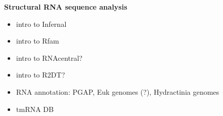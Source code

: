 \documentclass[landscape]{slides}
\begin{document}
\begin{slide}
\begin{center}
  \textbf{Structural RNA sequence analysis}
\end{center}

  \begin{itemize}
    \item intro to Infernal
    \item intro to Rfam
    \item intro to RNAcentral?
    \item intro to R2DT?
    \item RNA annotation: PGAP, Euk genomes (?), Hydractinia genomes
    \item tmRNA DB
  \end{itemize}
  \vfill
\end{slide}
    
\end{document}
